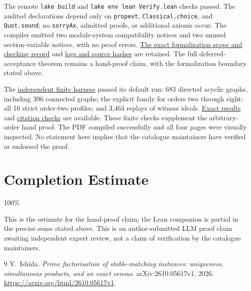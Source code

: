 \documentclass[11pt]{article}
\begin{document}
The remote \texttt{lake build} and \texttt{lake env lean Verify.lean}
checks passed. The audited declarations depend only on
\texttt{propext}, \texttt{Classical.choice}, and \texttt{Quot.sound};
no \texttt{sorryAx}, admitted proofs, or additional axioms occur.
The compiler emitted two module-system compatibility notices and two
unused section-variable notices, with no proof errors.
\href{https://github.com/jbaelaw/prime-da-state-counts/blob/eec79a6a79c77683811142c06c7c5cc71ad48bf6/verification/LeanVerification.json}{The exact formalization scope and checking record}
and \href{https://github.com/jbaelaw/prime-da-state-counts/tree/eec79a6a79c77683811142c06c7c5cc71ad48bf6/lean/verification}{logs and source hashes}
are retained. The full deferred-acceptance theorem remains a hand-proof
claim, with the formalization boundary stated above.

The \href{https://github.com/jbaelaw/prime-da-state-counts/blob/eec79a6a79c77683811142c06c7c5cc71ad48bf6/verification/verify.py}{independent finite harness}
passed its default run: 683 directed acyclic graphs, including 396
connected graphs; the explicit family for orders two through eight;
all 16 strict order-two profiles; and 3,464 replays of witness ideals.
\href{https://github.com/jbaelaw/prime-da-state-counts/blob/eec79a6a79c77683811142c06c7c5cc71ad48bf6/verification/verification.json}{Exact results}
and \href{https://github.com/jbaelaw/prime-da-state-counts/blob/eec79a6a79c77683811142c06c7c5cc71ad48bf6/paper/CitationAudit.json}{citation checks}
are available. These finite checks supplement the arbitrary-order
hand proof. The PDF compiled successfully and all four pages were
visually inspected. No statement here implies that the catalogue
maintainers have verified or endorsed the proof.

\section*{Completion Estimate}
100\%

This is the estimate for the hand-proof claim; the Lean companion is partial in the
precise sense stated above. This is an author-submitted LLM proof claim
awaiting independent expert review, not a claim of verification by the
catalogue maintainers.

\begin{thebibliography}{9}
Y.~Ishida.
\emph{Prime factorisation of stable-matching instances: uniqueness,
simultaneous products, and an exact census}.
arXiv:2610.05617v1, 2026.
\url{https://arxiv.org/html/2610.05617v1}.
\end{thebibliography}
\end{document}
